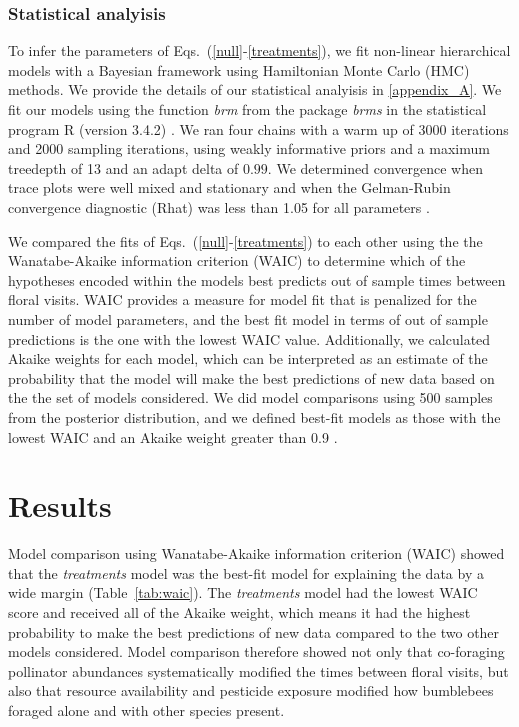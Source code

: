 \begin{refsection}
\subsubsection*{Statistical analyisis}

To  infer the parameters of Eqs.~(\ref{null}-\ref{treatments}), we fit non-linear hierarchical models with a Bayesian framework using Hamiltonian Monte Carlo (HMC) methods. We provide the details of our statistical analyisis in \autoref{appendix_A}. We fit our  models using the function  \textit{brm} from the package \textit{brms} \citep{burkner_advanced_2017} in the statistical program \textsc{R} (version 3.4.2) \citep{Rcore}. We ran four chains with a warm up of 3000 iterations and 2000 sampling iterations, using weakly informative priors and a maximum treedepth of 13 and an adapt delta of $0.99$. We determined convergence when trace plots were well mixed and stationary and when the Gelman-Rubin convergence diagnostic (Rhat) was less than 1.05 for all parameters \citep{vehtari_rank-normalization_2020}.

We compared the fits of  Eqs.~(\ref{null}-\ref{treatments}) to each other using the the Wanatabe-Akaike information criterion (WAIC) to determine which of the hypotheses encoded within the models best predicts out of sample times between floral visits. WAIC provides a measure for model fit that is penalized for the number of model parameters, and the best fit model in terms of out of sample predictions is the one with the lowest WAIC value. Additionally, we calculated Akaike weights for each model, which can be  interpreted as an estimate of the probability that the model will make the best predictions of new data based on the the set of models considered. We did model comparisons using 500 samples from the posterior distribution, and we defined best-fit models as those with the lowest WAIC and an Akaike weight greater than 0.9 \citep{mcelreath_statistical_2018}.

\section*{Results}

Model comparison using Wanatabe-Akaike information criterion (WAIC) showed that the \textit{treatments} model was the best-fit model for explaining the data by a wide margin (Table~\ref{tab:waic}). The \textit{treatments} model had the lowest WAIC score and received all of the Akaike weight, which means it had the highest probability to make the best predictions of new data compared to the two other models considered. Model comparison therefore showed not only that co-foraging pollinator abundances systematically modified the times between floral visits, but also that resource availability and pesticide exposure modified how bumblebees foraged alone and with other species present.


\end{refsection}

